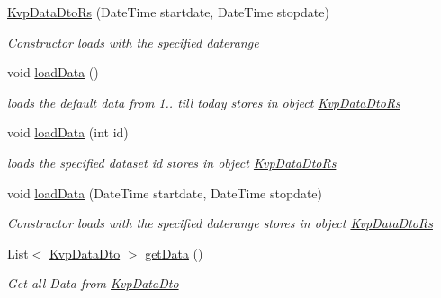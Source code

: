 \begin{DoxyCompactItemize}
\hyperlink{classkpi_mvc_api_1_1_data_transfer_objects_1_1_kvp_data_dto_rs_a4d9df8d729c0009c23968a0250d45dcc}{Kvp\+Data\+Dto\+Rs} (Date\+Time startdate, Date\+Time stopdate)
\begin{DoxyCompactList}\small\item\em Constructor loads with the specified daterange \end{DoxyCompactList}\item 
void \hyperlink{classkpi_mvc_api_1_1_data_transfer_objects_1_1_kvp_data_dto_rs_a562207c4315e1f552734257d994cc2d5}{load\+Data} ()
\begin{DoxyCompactList}\small\item\em loads the default data from 1.. till today stores in object {\ttfamily \hyperlink{classkpi_mvc_api_1_1_data_transfer_objects_1_1_kvp_data_dto_rs}{Kvp\+Data\+Dto\+Rs}} \end{DoxyCompactList}\item 
void \hyperlink{classkpi_mvc_api_1_1_data_transfer_objects_1_1_kvp_data_dto_rs_a7c0a2f992ea673548b507ee6a74e4046}{load\+Data} (int id)
\begin{DoxyCompactList}\small\item\em loads the specified dataset id stores in object {\ttfamily \hyperlink{classkpi_mvc_api_1_1_data_transfer_objects_1_1_kvp_data_dto_rs}{Kvp\+Data\+Dto\+Rs}} \end{DoxyCompactList}\item 
void \hyperlink{classkpi_mvc_api_1_1_data_transfer_objects_1_1_kvp_data_dto_rs_afbda5e8db6a5f8b25125d2a6b6dcf7e1}{load\+Data} (Date\+Time startdate, Date\+Time stopdate)
\begin{DoxyCompactList}\small\item\em Constructor loads with the specified daterange stores in object {\ttfamily \hyperlink{classkpi_mvc_api_1_1_data_transfer_objects_1_1_kvp_data_dto_rs}{Kvp\+Data\+Dto\+Rs}} \end{DoxyCompactList}\item 
List$<$ \hyperlink{classkpi_mvc_api_1_1_data_transfer_objects_1_1_kvp_data_dto}{Kvp\+Data\+Dto} $>$ \hyperlink{classkpi_mvc_api_1_1_data_transfer_objects_1_1_kvp_data_dto_rs_a895f4b97fb8c74c1a853145c03f5d393}{get\+Data} ()
\begin{DoxyCompactList}\small\item\em Get all Data from {\ttfamily \hyperlink{classkpi_mvc_api_1_1_data_transfer_objects_1_1_kvp_data_dto}{Kvp\+Data\+Dto}} \end{DoxyCompactList}\item 

\end{DoxyCompactItemize}
